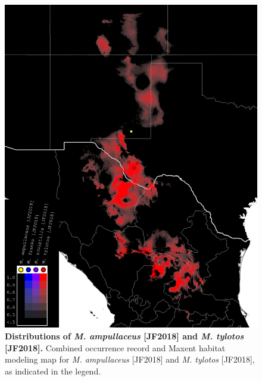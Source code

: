 \documentclass[fleqn,10pt,lineno]{wlpeerj} %
\begin{document}
\begin{figure}[h]
	\centering
	\includegraphics[width=\textwidth]{figure5.png}
	\caption{\textbf{Distributions of \textit{M. ampullaceus} [JF2018] and \textit{M. tylotos} [JF2018].} Combined occurrence record and Maxent habitat modeling map for \textit{M. ampullaceus} [JF2018] and \textit{M. tylotos} [JF2018], as indicated in the legend.}
	\label{fig:map_amptyl}
\end{figure}
\end{document}
